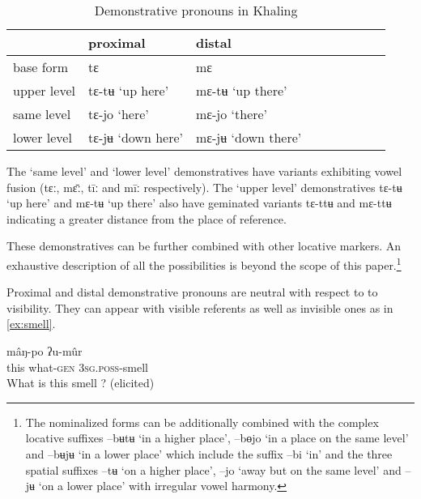 \documentclass[oldfontcommands,oneside,a4paper,11pt]{article}
\newcommand{\ipa}[1]{{\phon \mbox{#1}}} %
\begin{document}
 
\begin{table}[h]
\caption{Demonstrative pronouns in Khaling} \centering \label{tab:pro}
\begin{tabular}{lllllllll}
\toprule
	& proximal & distal \\
 
\midrule
	base form    &	\ipa{tɛ}        &	\ipa{mɛ}        &	\\
	upper level    &	\ipa{tɛ-tʉ}   `up here'    &	\ipa{mɛ-tʉ}   `up there'    &	\\
	same level    &	\ipa{tɛ-jo}   `here' &     \ipa{mɛ-jo}        `there' &	\\
	lower level   &	\ipa{tɛ-jʉ}  `down here'  &    	\ipa{mɛ-jʉ}     	 `down there' &	\\
\bottomrule
\end{tabular} 
\end{table}

The `same level' and  `lower level' demonstratives have variants exhibiting vowel fusion (\ipa{tɛː}, \ipa{mɛ̄ː}, \ipa{tīː} and \ipa{mīː}  respectively). The `upper level' demonstratives \ipa{tɛ-tʉ}   `up here' and	\ipa{mɛ-tʉ}   `up there' also have geminated variants \ipa{tɛ-ttʉ}  and	\ipa{mɛ-ttʉ} indicating a greater distance from the place of reference.


These demonstratives can be further combined with other locative markers. An exhaustive description of all the possibilities is beyond the scope of this paper.\footnote{The nominalized forms can be additionally combined with the complex locative suffixes \ipa{--bʉtʉ} `in a higher place', \ipa{--bɵjo} `in a place on the same level' and \ipa{--bʉjʉ} `in a lower place' which include the suffix \ipa{--bi} `in' and the three spatial suffixes \ipa{--tʉ} `on a higher place', \ipa{--jo} `away but on the same level' and \ipa{--jʉ} `on a lower place' with irregular vowel harmony.}



Proximal and distal demonstrative pronouns are neutral with respect to to visibility. They can appear with visible referents as well as invisible ones as in \ref{ex:smell}.
 

\begin{exe}
\ex \label{ex:smell}
\gll   \ipa{tɛ}    \ipa{mâŋ-po}    \ipa{ʔu-mûr}   \\
this what-\textsc{gen} \textsc{3sg.poss}-smell\\
\glt What is this smell ? (elicited)
\end{exe}
\end{document}
